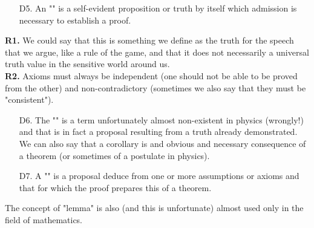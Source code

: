 \begin{itemize}
	\item[D5.] An "" is a self-evident proposition or truth by itself which admission is necessary to establish a proof.\label{axiom} 
\end{itemize}

	\begin{tcolorbox}[title=Remarks,arc=10pt,breakable,drop lifted shadow,
  skin=enhanced,
  skin first is subskin of={enhancedfirst}{arc=10pt,no shadow},
  skin middle is subskin of={enhancedmiddle}{arc=10pt,no shadow},
  skin last is subskin of={enhancedlast}{drop lifted shadow}]
	\textbf{R1.} We could say that this is something we define as the truth for the speech that we argue, like a rule of the game, and that it does not necessarily a universal truth value in the sensitive world around us.\\

	\textbf{R2.} Axioms must always be independent (one should not be able to be proved from the other) and non-contradictory (sometimes we also say that they must be "consistent"). 
	\end{tcolorbox}	
	
\begin{itemize}
	\item[D6.] The "" is a term unfortunately almost non-existent in physics (wrongly!) and that is in fact a proposal resulting from a truth already demonstrated. We can also say that a corollary is and obvious and necessary consequence of a theorem (or sometimes of a postulate in physics). 

	\item[D7.] A "" is a proposal deduce from one or more assumptions or axioms and that for which the proof prepares this of a theorem.
\end{itemize}

	\begin{tcolorbox}[title=Remark,arc=10pt,breakable,drop lifted shadow,
  skin=enhanced,
  skin first is subskin of={enhancedfirst}{arc=10pt,no shadow},
  skin middle is subskin of={enhancedmiddle}{arc=10pt,no shadow},
  skin last is subskin of={enhancedlast}{drop lifted shadow}]
The concept of "lemma" is also (and this is unfortunate) almost used only in the field of mathematics. 
	\end{tcolorbox}	

